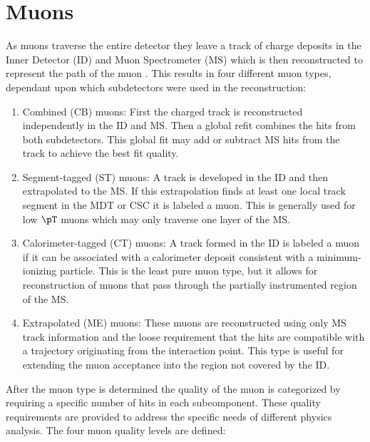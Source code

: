 \section{Muons} \label{sec:objects:muons}

As muons traverse the entire detector they leave a track of charge deposits in
the Inner Detector (ID) and Muon Spectrometer (MS) which is then reconstructed to
represent the path of the muon \cite{Aad:2016jkr}. This results in four
different muon types, dependant upon which subdetectors were used in the
reconstruction:

\begin{enumerate}
  \item Combined (CB) muons: First the charged track is reconstructed independently in the ID and MS.  Then a global refit combines the hits from both subdetectors. This global fit may add or subtract MS hits from the track to achieve the best fit quality.
  \item Segment-tagged (ST) muons: A track is developed in the ID and then extrapolated to the MS.  If this extrapolation finds at least one local track segment in the MDT or CSC it is labeled a muon.  This is generally used for low $\pT$ muons which may only traverse one layer of the MS.
  \item Calorimeter-tagged (CT) muons: A track formed in the ID is labeled a muon if it can be associated with a calorimeter deposit consistent with a minimum-ionizing particle.  This is the least pure muon type, but it allows for reconstruction of muons that pass through the partially instrumented region of the MS.
  \item Extrapolated (ME) muons: These muons are reconstructed using only MS track information and the loose requirement that the hits are compatible with a trajectory originating from the interaction point.  This type is useful for extending the muon acceptance into the region not covered by the ID.
\end{enumerate}

After the muon type is determined the quality of the muon is categorized by
requiring a specific number of hits in each subcomponent.  These quality
requirements are provided to address the specific needs of different physics
analysis. The four muon quality levels are defined:

